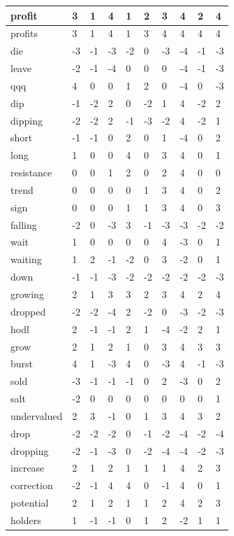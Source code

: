 \documentclass[a4paper,11pt,oneside]{article}
\begin{document}
\begin{center}
\begin{longtable}{| l | l | l | l | l | l | l | l | l | l |}
  		\hline
  		profit &3&1&4&1&2&3&4&2&4  \\
  		\hline
  		profits &3&1&4&1&3&4&4&4&4  \\
  		\hline
  		die & -3&-1&-3&-2&0&-3&-4&-1&-3 \\
  		\hline
  		leave & -2&-1&-4&0&0&0&-4&-1&-3\\
  		\hline
  		qqq & 4 &0&0&1&2&0&-4&0&-3 \\
  		\hline
  		dip & -1&-2&2&0&-2&1&4&-2&2 \\
  		\hline
  		dipping & -2&-2&2&-1&-3&-2&4&-2&1 \\
  		\hline
  		short & -1&-1&0&2&0&1&-4&0&2 \\
  		\hline
  		long & 1&0&0&4&0&3&4&0&1 \\
  		\hline
  		resistance & 0 &0&1&2&0&2&4&0&0   \\
  		\hline
  		trend & 0  &0&0&0&1&3&4&0&2 \\
  		\hline
  		sign & 0  &0&0&1&1&3&4&0&3 \\
  		\hline
  		falling &  -2&0&-3&3&-1&-3&-3&-2&-2 \\
  		\hline
  		wait &  1&0&0&0&0&4&-3&0&1\\
  		\hline
  		waiting & 1&2&-1&-2&0&3&-2&0&1 \\
  		\hline
  		down & -1&-1&-3&-2&-2&-2&-2&-2&-3 \\
  		\hline
  		growing & 2&1&3&3&2&3&4&2&4   \\
  		\hline
  		dropped & -2&-2&-4&2&-2&0&-3&-2&-3 \\
  		\hline
  		hodl & 2&-1&-1&2&1&-4&-2&2&1 \\
  		\hline
  		grow & 2&1&2&1&0&3&4&3&3 \\
  		\hline
  		burst & 4&1&-3&4&0&-3&4&-1&-3 \\
  		\hline
  		sold & -3&-1&-1&-1&0&2&-3&0&2 \\
  		\hline
  		salt & -2&0&0&0&0&0&0&0&1 \\
  		\hline
  		undervalued & 2&3&-1&0&1&3&4&3&2 \\
  		\hline
  		drop & -2&-2&-2&0&-1&-2&-4&-2&-4   \\
  		\hline
  		dropping & -2&-1&-3&0&-2&-4&-4&-2&-3 \\
  		\hline
  		increase & 2&1&2&1&1&1&4&2&3 \\
  		\hline
  		correction & -2&-1&4&4&0&-1&4&0&1 \\
  		\hline
  		potential & 2&1&2&1&1&2&4&2&3 \\
  		\hline
  		holders & 1&-1&-1&0&1&2&-2&1&1 \\

\end{longtable}
\end{center}
\end{document}
